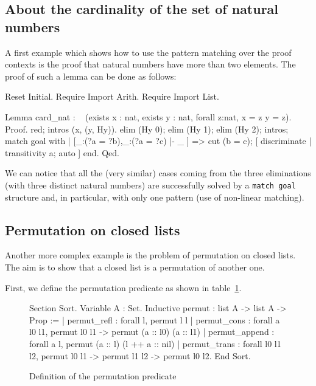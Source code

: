 \begin{coq_example}
\subsection{About the cardinality of the set of natural numbers}

A first example which shows how to use the pattern matching over the proof
contexts is the proof that natural numbers have more than two elements. The
proof of such a lemma can be done as %
follows:
\begin{coq_eval}
Reset Initial.
Require Import Arith.
Require Import List.
\end{coq_eval}
\begin{coq_example*}
Lemma card_nat :
 ~ (exists x : nat, exists y : nat, forall z:nat, x = z \/ y = z).
Proof.
red; intros (x, (y, Hy)).
elim (Hy 0); elim (Hy 1); elim (Hy 2); intros;
 match goal with
 | [_:(?a = ?b),_:(?a = ?c) |- _ ] =>
     cut (b = c); [ discriminate | transitivity a; auto ]
 end.
Qed.
\end{coq_example*}

We can notice that all the (very similar) cases coming from the three
eliminations (with three distinct natural numbers) are successfully solved by
a {\tt match goal} structure and, in particular, with only one pattern (use
of non-linear matching).

\subsection{Permutation on closed lists}

Another more complex example is the problem of permutation on closed lists. The
aim is to show that a closed list is a permutation of another one.

First, we define the permutation predicate as shown in table~\ref{permutpred}.

\begin{figure}
\begin{centerframe}
\begin{coq_example*}
Section Sort.
Variable A : Set.
Inductive permut : list A -> list A -> Prop :=
  | permut_refl   : forall l, permut l l
  | permut_cons   :
      forall a l0 l1, permut l0 l1 -> permut (a :: l0) (a :: l1)
  | permut_append : forall a l, permut (a :: l) (l ++ a :: nil)
  | permut_trans  :
      forall l0 l1 l2, permut l0 l1 -> permut l1 l2 -> permut l0 l2.
End Sort.
\end{coq_example*}
\end{centerframe}
\caption{Definition of the permutation predicate}
\label{permutpred}
\end{figure}


\end{coq_example}
